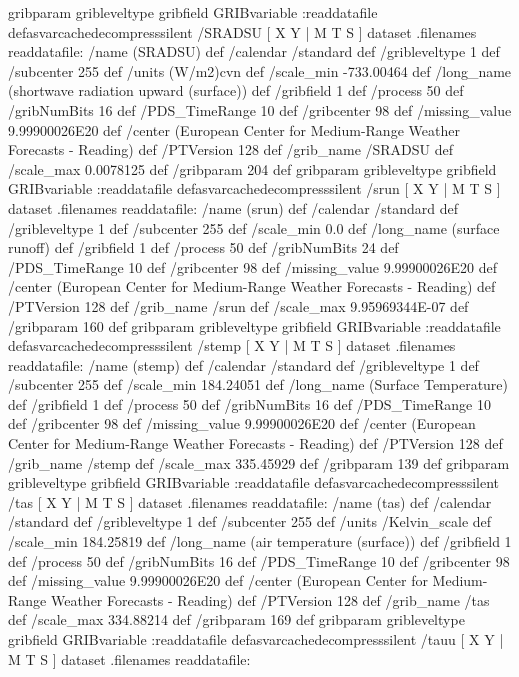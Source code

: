 \begin{ingrid}
{{ gribparam gribleveltype gribfield GRIBvariable
 :readdatafile
}defasvarcachedecompresssilent
 /SRADSU{
[ X Y | M T S ] dataset .filenames readdatafile:
/name (SRADSU) def
 /calendar /standard def
 /gribleveltype 1 def
 /subcenter 255 def
 /units (W/m2)cvn def
 /scale_min -733.00464 def
 /long_name (shortwave radiation upward (surface)) def
 /gribfield 1 def
 /process 50 def
 /gribNumBits 16 def
 /PDS_TimeRange 10 def
 /gribcenter 98 def
 /missing_value 9.99900026E20 def
 /center (European Center for Medium-Range Weather Forecasts - Reading) def
 /PTVersion 128 def
 /grib_name /SRADSU def
 /scale_max 0.0078125 def
 /gribparam 204 def
 gribparam gribleveltype gribfield GRIBvariable
 :readdatafile
}defasvarcachedecompresssilent
 /srun{
[ X Y | M T S ] dataset .filenames readdatafile:
/name (srun) def
 /calendar /standard def
 /gribleveltype 1 def
 /subcenter 255 def
 /scale_min 0.0 def
 /long_name (surface runoff) def
 /gribfield 1 def
 /process 50 def
 /gribNumBits 24 def
 /PDS_TimeRange 10 def
 /gribcenter 98 def
 /missing_value 9.99900026E20 def
 /center (European Center for Medium-Range Weather Forecasts - Reading) def
 /PTVersion 128 def
 /grib_name /srun def
 /scale_max 9.95969344E-07 def
 /gribparam 160 def
 gribparam gribleveltype gribfield GRIBvariable
 :readdatafile
}defasvarcachedecompresssilent
 /stemp{
[ X Y | M T S ] dataset .filenames readdatafile:
/name (stemp) def
 /calendar /standard def
 /gribleveltype 1 def
 /subcenter 255 def
 /scale_min 184.24051 def
 /long_name (Surface Temperature) def
 /gribfield 1 def
 /process 50 def
 /gribNumBits 16 def
 /PDS_TimeRange 10 def
 /gribcenter 98 def
 /missing_value 9.99900026E20 def
 /center (European Center for Medium-Range Weather Forecasts - Reading) def
 /PTVersion 128 def
 /grib_name /stemp def
 /scale_max 335.45929 def
 /gribparam 139 def
 gribparam gribleveltype gribfield GRIBvariable
 :readdatafile
}defasvarcachedecompresssilent
 /tas{
[ X Y | M T S ] dataset .filenames readdatafile:
/name (tas) def
 /calendar /standard def
 /gribleveltype 1 def
 /subcenter 255 def
 /units /Kelvin_scale def
 /scale_min 184.25819 def
 /long_name (air temperature (surface)) def
 /gribfield 1 def
 /process 50 def
 /gribNumBits 16 def
 /PDS_TimeRange 10 def
 /gribcenter 98 def
 /missing_value 9.99900026E20 def
 /center (European Center for Medium-Range Weather Forecasts - Reading) def
 /PTVersion 128 def
 /grib_name /tas def
 /scale_max 334.88214 def
 /gribparam 169 def
 gribparam gribleveltype gribfield GRIBvariable
 :readdatafile
}defasvarcachedecompresssilent
 /tauu{
[ X Y | M T S ] dataset .filenames readdatafile:
}}
\end{ingrid}
